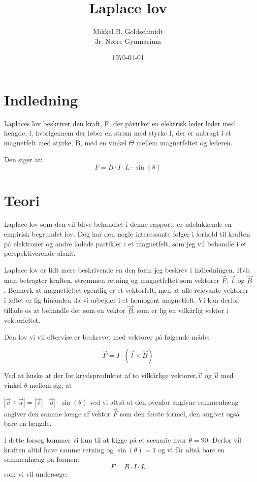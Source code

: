 \documentclass[10pt,a4paper]{article}
\author{Mikkel B. Goldschmidt\\3r, Nørre Gymnasium}
\title{Laplace lov}
\date{\today}
\theoremstyle{break}
\theoremstyle{nonumberplain}
\begin{document}
\maketitle

\section{Indledning}
Laplaces lov beskriver den kraft, F, der påvirker en elektrisk leder leder med længde, l, hvorigennem der løber en strøm med styrke I, der er anbragt i et magnetfelt med styrke, B, med en vinkel $\Theta$ mellem magnetfeltet og lederen.

Den siger at: 
$$F=B \cdot I \cdot L\cdot \sin (\theta)$$

\section{Teori}
Laplace lov som den vil blive behandlet i denne rapport, er udelukkende en empirisk begrundet lov. 
Dog har den nogle interessante følger i forhold til kraften på elektroner og andre ladede partikler i et magnetfelt, som jeg vil behandle i et perspektiverende afsnit. 

Laplace lov er lidt mere beskrivende en den form jeg beskrev i indledningen. 
Hvis man betragter kraften, strømmen retning og magnetfeltet som vektorer $\overrightarrow{F}$, $\overrightarrow{l}$ og $\overrightarrow{B}$.
Bemærk at magnetfeltet egentlig er et vektorfelt, men at alle relevante vektorer i feltet er lig hinanden da vi arbejder i et homogent magnetfelt. 
Vi kan derfor tillade os at behandle det som en vektor $\overrightarrow{B}$, som er lig en vilkårlig vektor i vektorfeltet. 

Den lov vi vil eftervise er beskrevet med vektorer på følgende måde:
\newcommand{\vek}[1]{\overrightarrow{#1}}

$$\vek{F} = I\cdot (\vek{l}\times \vek{B})$$

Ved at huske at der for krydsproduktet af to vilkårlige vektorer,$\vek{v}$ og $\vek{u}$ med vinkel $\theta$ mellem sig, at 

$|\vek{v} \times \vek{u}|=|\vek{v}|\cdot |\vek{u}| \cdot \sin (\theta)$ ved vi altså at den ovenfor angivne sammenhæng angiver den samme længe af vektor $\vek{F}$ som den første formel, den angiver også bare en længde.

I dette forsøg kommer vi kun til at kigge på et scenarie hvor $\theta=90$. 
Derfor vil kraften altid have samme retning og $\sin (\theta) = 1$ og vi får altså bare en sammenhæng på formen:
$$F = B\cdot I\cdot L$$
som vi vil undersøge.
\end{document}
